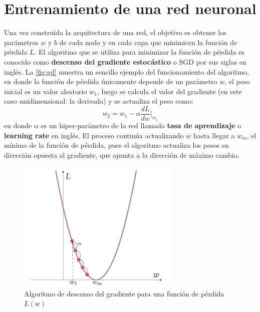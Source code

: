 \section{Entrenamiento de una red neuronal}\label{sec:TrainNN}
Una vez construida la arquitectura de una red, el objetivo es obtener los parámetros $w$ y $b$ de cada nodo y en cada capa que minimicen la función de pérdida $L$. El algoritmo que se utiliza para minimizar la función de pérdida es conocido como \textbf{descenso del gradiente estocástico} o SGD por sus siglas en inglés. La \autoref{fig:gd} muestra un sencillo ejemplo del funcionamiento del algoritmo, en donde la función de pérdida únicamente depende de un parámetro $w$, el peso inicial es un valor aleatorio $w_1$, luego se calcula el valor del gradiente (en este caso unidimensional: la derivada) y se actualiza el peso como:
$$w_2 = w_1 - \alpha \frac{dL}{dw}\bigg|_{w_1}$$
en donde $\alpha$ es un hiper-parámetro de la red llamado \textbf{tasa de aprendizaje} o \textbf{learning rate} en inglés. El proceso continúa actualizando $w$ hasta llegar a $w_m$, el mínimo de la función de pérdida, pues el algoritmo actualiza los pesos en dirección opuesta al gradiente, que apunta a la dirección de máximo cambio.

\begin{figure}[h]
  \centering
  \includegraphics[width=0.7\textwidth]{./img/GD.png}
\caption{Algoritmo de descenso del gradiente para una función de pérdida $L(w)$}
\label{fig:gd}
\end{figure}

